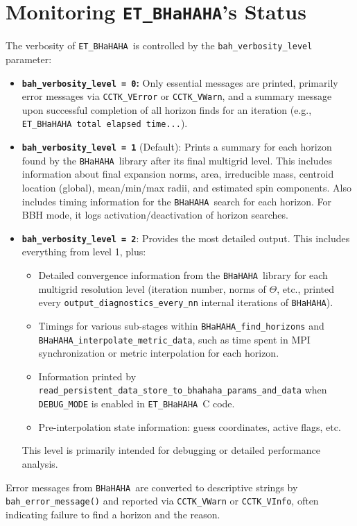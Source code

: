 \documentclass[a4paper,11pt]{article}
\newcommand{\thorn}[1]{{\tt #1}}
\newcommand{\BHaHAHA}{\thorn{ET\_BHaHAHA}} %
\newcommand{\bhahlib}{\texttt{BHaHAHA}} %
\begin{document}
\section{Monitoring \BHaHAHA's Status}
\label{sec:monitoring}
The verbosity of \BHaHAHA\ is controlled by the \texttt{bah\_verbosity\_level} parameter:
\begin{itemize}
    \item \textbf{\texttt{bah\_verbosity\_level = 0}:} Only essential messages are printed, primarily error messages via \texttt{CCTK\_VError} or \texttt{CCTK\_VWarn}, and a summary message upon successful completion of all horizon finds for an iteration (e.g., \texttt{ET\_BHaHAHA total elapsed time...}).
    \item \textbf{\texttt{bah\_verbosity\_level = 1}} (Default): Prints a summary for each horizon found by the \bhahlib\ library after its final multigrid level. This includes information about final expansion norms, area, irreducible mass, centroid location (global), mean/min/max radii, and estimated spin components. Also includes timing information for the \bhahlib\ search for each horizon. For BBH mode, it logs activation/deactivation of horizon searches.
    \item \textbf{\texttt{bah\_verbosity\_level = 2}}: Provides the most detailed output. This includes everything from level 1, plus:
        \begin{itemize}
            \item Detailed convergence information from the \bhahlib\ library for each multigrid resolution level (iteration number, norms of $\Theta$, etc., printed every \texttt{output\_diagnostics\_every\_nn} internal iterations of \bhahlib).
            \item Timings for various sub-stages within \texttt{BHaHAHA\_find\_horizons} and \texttt{BHaHAHA\_interpolate\_metric\_data}, such as time spent in MPI synchronization or metric interpolation for each horizon.
            \item Information printed by \texttt{read\_persistent\_data\_store\_to\_bhahaha\_params\_and\_data} when \texttt{DEBUG\_MODE} is enabled in \BHaHAHA\ C code.
            \item Pre-interpolation state information: guess coordinates, active flags, etc.
        \end{itemize}
        This level is primarily intended for debugging or detailed performance analysis.
\end{itemize}
Error messages from \bhahlib\ are converted to descriptive strings by \texttt{bah\_error\_message()} and reported via \texttt{CCTK\_VWarn} or \texttt{CCTK\_VInfo}, often indicating failure to find a horizon and the reason.
\end{document}
